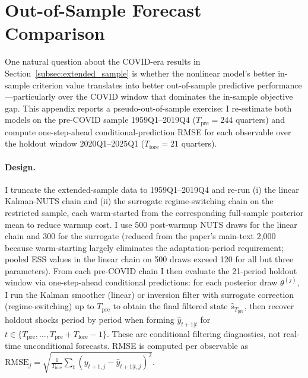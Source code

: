 \documentclass[12pt]{article}
\theoremstyle{plain}
\theoremstyle{definition}
\theoremstyle{remark}
\begin{document}
\section{Out-of-Sample Forecast Comparison}
\label{app:oos_forecast}

One natural question about the COVID-era results in Section~\ref{subsec:extended_sample} is whether the nonlinear model's better in-sample criterion value translates into better out-of-sample predictive performance---particularly over the COVID window that dominates the in-sample objective gap. This appendix reports a pseudo-out-of-sample exercise: I re-estimate both models on the pre-COVID sample 1959Q1--2019Q4 ($T_{\text{pre}} = 244$ quarters) and compute one-step-ahead conditional-prediction RMSE for each observable over the holdout window 2020Q1--2025Q1 ($T_{\text{fore}} = 21$ quarters).

\paragraph{Design.} I truncate the extended-sample data to 1959Q1--2019Q4 and re-run (i) the linear Kalman-NUTS chain and (ii) the surrogate regime-switching chain on the restricted sample, each warm-started from the corresponding full-sample posterior mean to reduce warmup cost. I use 500 post-warmup NUTS draws for the linear chain and 300 for the surrogate (reduced from the paper's main-text 2{,}000 because warm-starting largely eliminates the adaptation-period requirement; pooled ESS values in the linear chain on 500 draws exceed 120 for all but three parameters). From each pre-COVID chain I then evaluate the 21-period holdout window via one-step-ahead conditional predictions: for each posterior draw $\theta^{(j)}$, I run the Kalman smoother (linear) or inversion filter with surrogate correction (regime-switching) up to $T_{\text{pre}}$ to obtain the final filtered state $\hat{s}_{T_{\text{pre}}}$, then recover holdout shocks period by period when forming $\hat{y}_{t+1|t}$ for $t \in \{T_{\text{pre}}, \ldots, T_{\text{pre}} + T_{\text{fore}} - 1\}$. These are conditional filtering diagnostics, not real-time unconditional forecasts. RMSE is computed per observable as $\text{RMSE}_j = \sqrt{\frac{1}{T_{\text{fore}}}\sum_{t} (y_{t+1,j} - \hat{y}_{t+1|t,j})^2}$.
\end{document}
